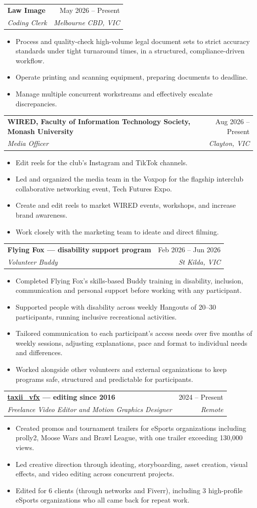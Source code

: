 \documentclass[letterpaper,11pt]{article}
\makeatletter
\newcommand{\resumeItem}[1]{\item\small{{#1 \vspace{-2pt}}}}
\newcommand{\resumeSubheading}[4]{
  \vspace{-2pt}\item
    \begin{tabular*}{0.97\textwidth}[t]{l@{\extracolsep{\fill}}r}
      \textbf{#1} & #2 \\
      \textit{\small#3} & \textit{\small #4} \\
    \end{tabular*}\vspace{-7pt}
}
\newcommand{\resumeItemListStart}{\begin{itemize}}
\newcommand{\resumeItemListEnd}{\end{itemize}\vspace{-5pt}}
\makeatother
\begin{document}
    \resumeSubheading
      {Law Image}{May 2026 -- Present}
      {Coding Clerk}{Melbourne CBD, VIC}
      \resumeItemListStart
        \resumeItem{Process and quality-check high-volume legal document sets to strict accuracy standards under tight turnaround times, in a structured, compliance-driven workflow.}
        \resumeItem{Operate printing and scanning equipment, preparing documents to deadline.}
        \resumeItem{Manage multiple concurrent workstreams and effectively escalate discrepancies.}
      \resumeItemListEnd

    \resumeSubheading
      {WIRED, Faculty of Information Technology Society, Monash University}{Aug 2026 -- Present}
      {Media Officer}{Clayton, VIC}
      \resumeItemListStart
        \resumeItem{Edit reels for the club's Instagram and TikTok channels.}
        \resumeItem{Led and organized the media team in the Voxpop for the flagship interclub collaborative networking event, Tech Futures Expo.}
        \resumeItem{Create and edit reels to market WIRED events, workshops, and increase brand awareness.}
        \resumeItem{Work closely with the marketing team to ideate and direct filming.}
      \resumeItemListEnd

    \resumeSubheading
      {Flying Fox --- disability support program}{Feb 2026 -- Jun 2026}
      {Volunteer Buddy}{St Kilda, VIC}
      \resumeItemListStart
        \resumeItem{Completed Flying Fox's skills-based Buddy training in disability, inclusion, communication and personal support before working with any participant.}
        \resumeItem{Supported people with disability across weekly Hangouts of 20--30 participants, running inclusive recreational activities.}
        \resumeItem{Tailored communication to each participant's access needs over five months of weekly sessions, adjusting explanations, pace and format to individual needs and differences.}
        \resumeItem{Worked alongside other volunteers and external organizations to keep programs safe, structured and predictable for participants.}
      \resumeItemListEnd

    \resumeSubheading
      {\href{http://x.com/taxii_vfx/all}{\underline{taxii\_vfx}} --- editing since 2016}{2024 -- Present}
      {Freelance Video Editor and Motion Graphics Designer}{Remote}
      \resumeItemListStart
        \resumeItem{Created promos and tournament trailers for eSports organizations including prolly2, Moose Wars and Brawl League, with one trailer exceeding 130,000 views.}
        \resumeItem{Led creative direction through ideating, storyboarding, asset creation, visual effects, and video editing across concurrent projects.}
        \resumeItem{Edited for 6 clients (through networks and Fiverr), including 3 high-profile eSports organizations who all came back for repeat work.}
      \resumeItemListEnd
\end{document}
